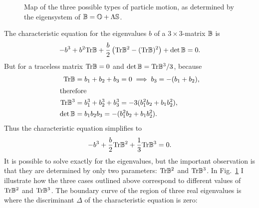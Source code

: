 \documentclass[thesis.tex]{subfiles}
\begin{document}
\begin{figure}
\begin{center}
\end{center}
\caption{\label{fig:bmap}  Map of the three possible types of particle motion, as determined by the eigensystem of $\mathbb{B}=\mathbb{O} + \Lambda \mathbb{S}$.}%
\end{figure}
The characteristic equation for the eigenvalues $b$ of a $3\times3$-matrix $\mathbb{B}$ is
\begin{align*}
	-b^3 + b^2\mbox{Tr} \mathbb{B}  + \frac{b}{2}\left(\mbox{Tr} \mathbb{B}^2-(\mbox{Tr} \mathbb{B})^2\right)+\det\mathbb{B} = 0.
\end{align*}
But for a traceless matrix $\mbox{Tr} \mathbb{B}=0$ and $\det \mathbb{B} = \mbox{Tr}\mathbb{B}^3/3$, because
\begin{align*}
	\mbox{Tr} \mathbb{B} &= b_1 + b_2 + b_3 = 0 \implies b_3 = -(b_1 + b_2),\\
	\intertext{therefore}
	\mbox{Tr} \mathbb{B}^3 &= b_1^3 + b_2^3 + b_3^3 = -3(b_1^2b_2 + b_1b_2^2),\\
	\det \mathbb{B} &= b_1b_2b_3 = -(b_1^2b_2 + b_1b_2^2).
\end{align*}
Thus the characteristic equation simplifies to
\begin{align}
	-b^3 + \frac{b}{2}\tr \ma B^2 +\frac{1}{3}\tr\ma B^3 = 0. \eqnlab{bcharacteristic}
\end{align}
It is possible to solve  exactly for the eigenvalues, but the important observation is that they are determined by only two parameters: $\mbox{Tr} \mathbb{B}^2$ and $\mbox{Tr}\mathbb{B}^3$. In Fig.~\ref{fig:bmap} I illustrate how the three cases outlined above correspond to different values of $\mbox{Tr} \mathbb{B}^2$ and $\mbox{Tr}\mathbb{B}^3$. The boundary curve of the region of three real eigenvalues is where the discriminant $\Delta$ of the characteristic equation is zero:
\end{document}
